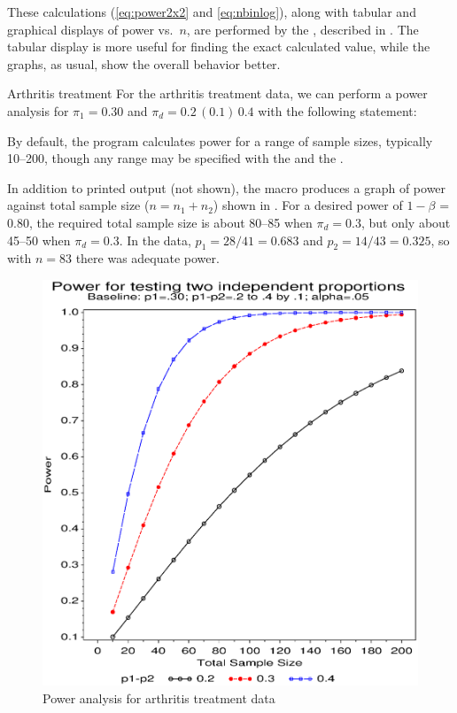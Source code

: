 These calculations (\eqref{eq:power2x2} and
\eqref{eq:nbinlog}),
along with tabular and graphical displays of power vs.\ $n$, are performed by the ,
described in .
The tabular display is more useful for finding the exact calculated value,
while the graphs, as usual, show the overall behavior better.

\begin{Example}[arthrit13]{Arthritis treatment}
For the arthritis treatment data, we can perform a power analysis
for $\pi_1 = 0.30$ and $\pi_d = 0.2 \,(0.1)\, 0.4$ with the following
statement:
\begin{listing}
\end{listing}
By default, the program calculates power for a range of sample sizes,
typically 10--200, though any range may be specified with the
 and the .

In addition to printed output (not shown), the macro produces a 
graph of power against total sample size ($n = n_1 + n_2$)
shown in .
For a desired power of $1-\beta$ = 0.80, the required total
sample size is about 80--85 when $\pi_d = 0.3$, but only
about 45--50 when $\pi_d = 0.3$.
In the data, $p_1 = 28/41 = 0.683$ and $p_2 = 14/43 = 0.325$,
so with $n=83$ there was adequate power.
\begin{figure}[htb]
  \centering
  \includegraphics[scale=.6]{ch6/fig/power2x2a}
  \caption{Power analysis for arthritis treatment data}%
  \label{fig:power2x2a}
\end{figure}
\end{Example}

